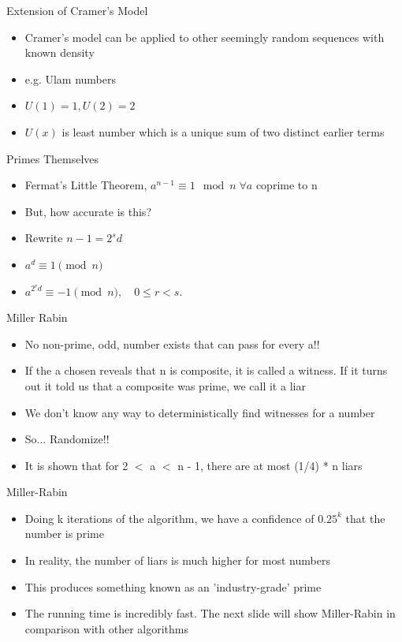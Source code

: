 \documentclass{beamer}
\begin{document}
\begin{frame}{Extension of Cramer's Model}
    \begin{itemize}
        \item Cramer's model can be applied to other seemingly random sequences with known density
        \item e.g. Ulam numbers
        \item $U(1) = 1, U(2) = 2$
        \item $U(x)$ is least number which is a unique sum of two distinct earlier terms
    \end{itemize}
\end{frame}
\begin{frame}{Primes Themselves}
\begin{itemize}
    \item Fermat's Little Theorem, $a^{n - 1} \equiv 1 \mod n \; \forall a$ coprime to n 
    \item But, how accurate is this?
    \item Rewrite $n - 1 = 2^s d$
    \item $a^d \equiv 1 \pmod{n}$
    \item $a^{2^r d} \equiv -1 \pmod{n}, \quad 0 \leq r < s.$
\end{itemize}
\end{frame}
\begin{frame}{Miller Rabin}
\begin{itemize}
    \item No non-prime, odd, number exists that can pass for every a!!
    \item If the a chosen reveals that n is composite, it is called a witness. If it turns out it told us that a composite was prime, we call it a liar
    \item We don't know any way to deterministically find witnesses for a number
    \item So... Randomize!!
    \item It is shown that for 2 $<$ a $<$ n - 1, there are at most (1/4) * n liars
\end{itemize}
\end{frame}
\begin{frame}{Miller-Rabin}
    \begin{itemize}
        \item Doing k iterations of the algorithm, we have a confidence of $0.25^{k}$ that the number is prime
        \item In reality, the number of liars is much higher for most numbers
        \item This produces something known as an 'industry-grade' prime
        \item The running time is incredibly fast. The next slide will show Miller-Rabin in comparison with other algorithms
    \end{itemize}
\end{frame}
\end{document}
